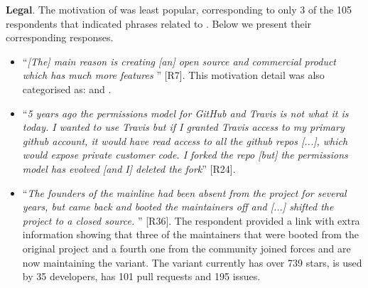 \nd \textbf{Legal}. The motivation of  was least popular, corresponding to only 3 of the 105 respondents that indicated phrases related to . Below we present their corresponding responses.

\begin{itemize}[leftmargin=*]
\item ``\emph{[The] main reason is creating [an] open source and commercial product which has much more features%
}'' [R7]. This motivation detail was also categorised as:  and .

\item ``\emph{5 years ago the permissions model for GitHub and Travis is not what it is today. I wanted to use Travis but if I granted Travis access to my primary github account, it would have read access to all the github repos [...], which would expose private customer code. I forked the repo [but] the permissions model has evolved [and I] %
deleted the fork}'' [R24].

\item ``\emph{The founders of the mainline had been absent from the project for several years, but came back and booted the maintainers off and
[...] shifted the project to a closed source. %
}'' [R36]. %
The respondent provided a link with extra information showing that three of the maintainers that were booted from the original project and a fourth one from the community joined forces and are now maintaining the variant. The variant currently has over 739 stars, is used by 35 developers, has 101 pull requests and 195 issues.
\end{itemize}


